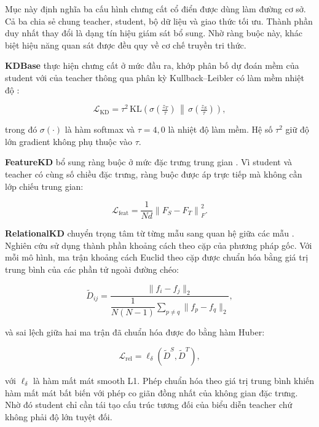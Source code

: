 Mục này định nghĩa ba cấu hình chưng cất cổ điển được dùng làm đường cơ sở.
Cả ba chia sẻ chung teacher, student, bộ dữ liệu và giao thức tối ưu. Thành
phần duy nhất thay đổi là dạng tín hiệu giám sát bổ sung. Nhờ ràng buộc này,
khác biệt hiệu năng quan sát được đều quy về cơ chế truyền tri thức.

\textbf{KDBase} thực hiện chưng cất ở mức đầu ra, khớp phân bố dự đoán mềm
của student với của teacher thông qua phân kỳ Kullback--Leibler có làm mềm
nhiệt độ \cite{hinton2015distilling}:

\begin{equation}
\label{eq:kd}
\mathcal{L}_{\mathrm{KD}} = \tau^{2}\,
  \mathrm{KL}\!\left(
  \sigma\!\left(\tfrac{z_T}{\tau}\right) \,\middle\|\,
  \sigma\!\left(\tfrac{z_S}{\tau}\right)\right),
\end{equation}

trong đó $\sigma(\cdot)$ là hàm softmax và $\tau = 4{,}0$ là nhiệt độ làm
mềm. Hệ số $\tau^{2}$ giữ độ lớn gradient không phụ thuộc vào $\tau$.

\textbf{FeatureKD} bổ sung ràng buộc ở mức đặc trưng trung gian
\cite{romero2015fitnets}. Vì student và teacher có cùng số chiều đặc trưng,
ràng buộc được áp trực tiếp mà không cần lớp chiếu trung gian:

\begin{equation}
\label{eq:feat}
\mathcal{L}_{\mathrm{feat}} = \frac{1}{Nd}
  \left\| F_S - F_T \right\|_{F}^{2}.
\end{equation}

\textbf{RelationalKD} chuyển trọng tâm từ từng mẫu sang quan hệ giữa các
mẫu \cite{park2019relational}. Nghiên cứu sử dụng thành phần khoảng cách
theo cặp của phương pháp gốc. Với mỗi mô hình, ma trận khoảng cách Euclid
theo cặp được chuẩn hóa bằng giá trị trung bình của các phần tử ngoài đường
chéo:

\begin{equation}
\label{eq:pdist}
\tilde{D}_{ij} = \frac{\|f_i - f_j\|_2}
  {\dfrac{1}{N(N-1)}\displaystyle\sum_{p \neq q} \|f_p - f_q\|_2},
\end{equation}

và sai lệch giữa hai ma trận đã chuẩn hóa được đo bằng hàm Huber:

\begin{equation}
\label{eq:rkd}
\mathcal{L}_{\mathrm{rel}} = \ell_{\delta}\!\left(
  \tilde{D}^{S}, \tilde{D}^{T} \right),
\end{equation}

với $\ell_{\delta}$ là hàm mất mát smooth L1. Phép chuẩn hóa theo giá trị trung bình khiến hàm mất mát bất biến với phép co giãn đồng nhất của không gian đặc trưng. Nhờ đó student chỉ cần tái tạo cấu trúc tương đối của biểu diễn teacher chứ không phải độ lớn tuyệt đối.

